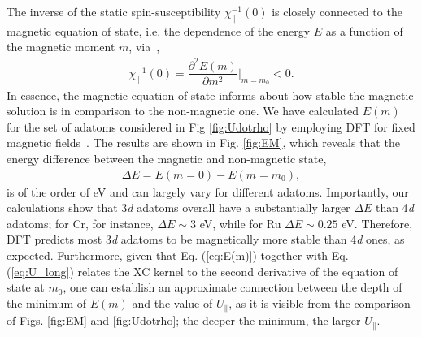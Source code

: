 \documentclass[prb,footinbib,showpacs,twocolumn,amsmath,amssymb]{revtex4}
\newcommand{\bek}{\begin{eqnarray}}
\newcommand{\ek}{\end{eqnarray}}
\begin{document}
\begin{figure*}[t]
\hfill
{}
\caption{(color online) (a) and (b), calculated energy as a function of the adatom's magnetic moment for 
3\textit{d} and 4\textit{d} transition metal elements, respectively. DFT calculations are denoted by markers,
while the solid lines are a fit to the calculations using 
$E=\sum_{i=2}^{8} a_{i}m^{i}$ with only even powers.
The horizontal dashed lines 
mark the minimum energies for different adatoms.}
\label{fig:EM}
\end{figure*}





The inverse of the static spin-susceptibility  
$\chi^{-1}_{\parallel}(0)$ is closely connected to the magnetic equation of state,
i.e. the dependence of the energy $E$ as a function of the magnetic moment $m$,
via~\cite{kubler_theory_2009},
\bek\label{eq:E(m)}
\chi^{-1}_{\parallel}(0)= \dfrac{\partial^{2}E(m)}{\partial m^{2}}\Big|_{m=m_{0}}<0.
\ek
In essence, the magnetic equation of state informs about how
stable the magnetic solution is in comparison to the non-magnetic one.
We have calculated $E(m)$ for the set of adatoms considered in Fig \ref{fig:Udotrho}
by employing DFT for fixed magnetic fields~\cite{kubler_theory_2009}. The results are shown in 
Fig. \ref{fig:EM}, which
reveals that the energy difference between the magnetic and non-magnetic state,
\bek
\Delta E = E(m=0) - E(m=m_{0}),
\ek
is of the order of eV and can largely vary for different adatoms.
Importantly, our calculations show that 3\textit{d} adatoms overall have a substantially 
larger $\Delta E$ than 4\textit{d} adatoms;
for Cr, for instance, $\Delta E\sim 3$ eV, while for Ru $\Delta E\sim 0.25$ eV.
Therefore, DFT predicts most 3\textit{d} adatoms to be magnetically more stable than 4\textit{d} ones,
as expected.
Furthermore, given that Eq. (\ref{eq:E(m)}) together with Eq. (\ref{eq:U_long}) 
relates the XC kernel to the second derivative of the
equation of state at $m_{0}$, one can establish an approximate connection between
the depth of the minimum of $E(m)$ and the value of $U_{\parallel}$,
as it is visible from the comparison of Figs. \ref{fig:EM} and \ref{fig:Udotrho};
the deeper the minimum, the larger $U_{\parallel}$.
\end{document}

